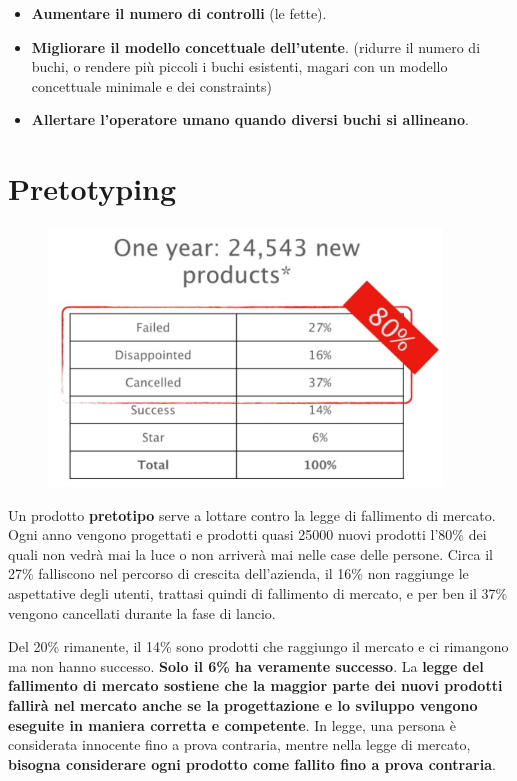 \documentclass[a4paper,11pt,oneside]{book}
\begin{document}
\begin{itemize}
	\item \textbf{Aumentare il numero di controlli} (le fette).
	\item \textbf{Migliorare il modello concettuale dell'utente}. (ridurre il numero di buchi, o rendere più piccoli i buchi esistenti, magari con un modello concettuale minimale e dei constraints)
	\item \textbf{Allertare l'operatore umano quando diversi buchi si allineano}.
\end{itemize}

\pagebreak

\chapter{Pretotyping}
\begin{figure}[!h]
	\centering
	\includegraphics[scale=0.5]{immagini/Fall_mercato.png}
\end{figure}
Un prodotto \textbf{pretotipo} serve a lottare contro la legge di fallimento di mercato. Ogni anno vengono progettati e prodotti quasi 25000 nuovi prodotti l'80\% dei quali non vedrà mai la luce o non arriverà mai nelle case delle persone. Circa il 27\%
falliscono nel percorso di crescita dell'azienda, il 16\% non raggiunge le aspettative degli utenti, trattasi quindi di fallimento di mercato, e per ben il 37\% vengono cancellati durante la fase di lancio.

Del 20\% rimanente, il 14\% sono prodotti che raggiungo il mercato e ci rimangono ma
non hanno successo. \textbf{Solo il 6\% ha veramente successo}. La
\textbf{legge del fallimento di mercato sostiene che la maggior parte dei nuovi prodotti fallirà nel mercato anche se la progettazione e lo sviluppo vengono eseguite in maniera corretta e competente}.
In legge, una persona è considerata innocente fino a prova contraria, mentre nella legge di mercato, \textbf{bisogna considerare ogni prodotto come fallito fino a prova contraria}.
\end{document}
